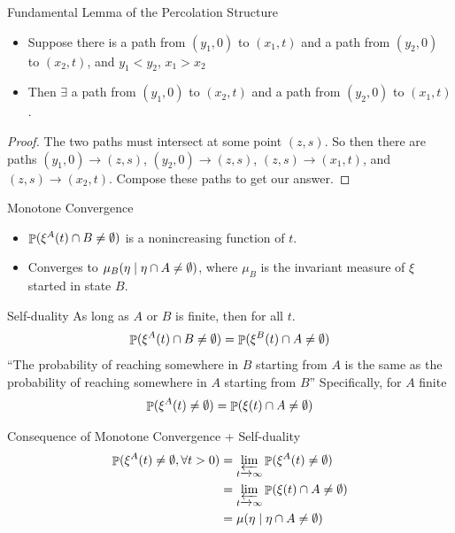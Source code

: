 \documentclass{beamer}
\begin{document}
\begin{frame}{Fundamental Lemma of the Percolation Structure}
  \begin{lemma}
    \begin{itemize}
      \item Suppose there is a path from $(y_{1},0)$ to $(x_{1},t)$ and a path from $(y_{2},0)$ to $(x_{2},t)$, and $y_{1} < y_{2}$, $x_{1} > x_{2}$
      \pause
      \item Then $\exists$ a path from $(y_{1},0)$ to $(x_{2},t)$ and a path from $(y_{2},0)$ to $(x_{1},t)$.
    \end{itemize}
  \end{lemma}
  \pause
  \begin{proof}
    The two paths must intersect at some point $(z,s)$. So then there are paths $(y_{1},0) \to (z,s)$, $(y_{2},0) \to (z,s)$, $(z,s) \to (x_{1},t)$, and $(z,s) \to (x_{2},t)$. Compose these paths to get our answer.
  \end{proof}
\end{frame}

\begin{frame}{Monotone Convergence}
  \begin{itemize}
    \item $\mathop{\mathbb{P}}(\xi^{A}(t) \cap B \neq \emptyset)$ is a nonincreasing function of $t$.
      \pause
    \item Converges to $\mu_{B}(\eta \mid \eta \cap A \neq \emptyset)$, where $\mu_{B}$ is the invariant measure of $\xi$ started in state $B$.
  \end{itemize}
\end{frame}

\begin{frame}{Self-duality}
  As long as $A$ or $B$ is finite, then for all $t$.
  \begin{equation}
    \mathop{\mathbb{P}}(\xi^{A}(t) \cap B \neq \emptyset) = \mathop{\mathbb{P}}(\xi^{B}(t) \cap A \neq \emptyset)
  \end{equation}
  \pause
  ``The probability of reaching somewhere in $B$ starting from $A$ is the same as the probability of reaching somewhere in $A$ starting from $B$''
  \pause
  Specifically, for $A$ finite
  \begin{equation}
    \mathop{\mathbb{P}}(\xi^{A}(t) \neq \emptyset) = \mathop{\mathbb{P}}(\xi(t) \cap A \neq \emptyset)
  \end{equation}
\end{frame}

\begin{frame}{Consequence of Monotone Convergence + Self-duality}
  \begin{align*}
    \Prob(\xi^{A}(t) \neq \emptyset, \forall t > 0) &= \limas_{t \to \infty} \Prob(\xi^{A}(t) \neq \emptyset) \\
                                 &= \limas_{t \to \infty} \Prob(\xi(t) \cap A \neq \emptyset) \\
                                 &= \mu(\eta \st \eta \cap A \neq \emptyset)
  \end{align*}
\end{frame}
\end{document}
